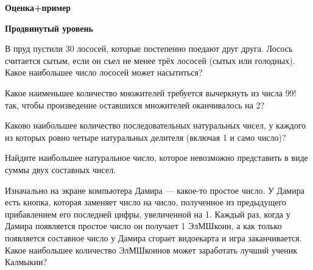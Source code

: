 \newpage

\hspace{3mm}

\centerline{\bf \Huge Оценка+пример}

\centerline{\bf \large Продвинутый уровень}

\begin{flushright}
        \scriptsize{}
\end{flushright}

В пруд пустили 30 лососей, которые постепенно поедают друг друга. Лосось считается сытым, если он съел не менее трёх лососей (сытых или голодных). Какое наибольшее число лососей может насытиться?

Какое наименьшее количество множителей требуется вычеркнуть из числа 99! так, чтобы произведение оставшихся множителей оканчивалось на 2?

 Каково наибольшее количество последовательных натуральных чисел, у каждого из которых ровно четыре натуральных делителя (включая 1 и само число)?

Найдите наибольшее натуральное число, которое невозможно представить в виде суммы двух составных чисел.

Изначально на экране компьютера Дамира --- какое-то простое число. У Дамира есть кнопка, которая заменяет число на число, полученное из предыдущего прибавлением его последней цифры, увеличенной на 1. Каждый раз, когда у Дамира появляется простое число он получает 1 ЭлМШкоин, а как только появляется составное число у Дамира сгорает видоекарта и игра заканчивается. Какое наибольшее количество ЭлМШкоинов может заработать лучший ученик Калмыкии?